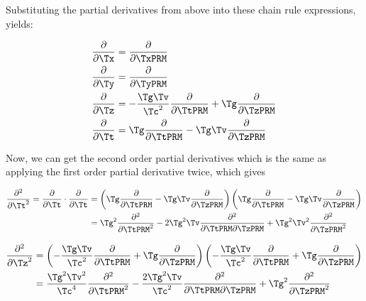 \begin{derivation}
	Substituting the partial derivatives from above into these chain rule expressions, yields:

	\begin{equation}
		\begin{aligned}
			\frac{\partial}{\partial \Tx } & = \frac{\partial}{\partial \TxPRM }                                                             \\
			\frac{\partial}{\partial \Ty } & = \frac{\partial}{\partial \TyPRM }                                                             \\
			\frac{\partial}{\partial \Tz } & = -\frac{\Tg  \Tv }{\Tc ^2} \frac{\partial}{\partial \TtPRM } + \Tg  \frac{\partial}{\partial \TzPRM } \\
			\frac{\partial}{\partial \Tt } & = \Tg  \frac{\partial}{\partial \TtPRM } - \Tg  \Tv  \frac{\partial}{\partial \TzPRM }
		\end{aligned}
	\end{equation}

	Now, we can get the second order partial derivatives which is the same as applying the first order partial derivative twice, which gives

	\begin{equation}
		\begin{aligned}
			\frac{\partial^2}{\partial \Tt ^2} = \frac{\partial}{\partial \Tt } \cdot \frac{\partial}{\partial \Tt } & = \left(\Tg  \frac{\partial}{\partial \TtPRM } - \Tg  \Tv  \frac{\partial}{\partial \TzPRM }\right) \left(\Tg  \frac{\partial}{\partial \TtPRM } - \Tg  \Tv  \frac{\partial}{\partial \TzPRM }\right) \\
			                                                                                                & = \Tg ^2 \frac{\partial^2}{\partial \TtPRM ^2} - 2\Tg ^2 \Tv  \frac{\partial^2}{\partial \TtPRM \partial \TzPRM } + \Tg ^2 \Tv ^2 \frac{\partial^2}{\partial \TzPRM ^2}
		\end{aligned}
	\end{equation}

	\begin{equation}
		\begin{aligned}
			\frac{\partial^2}{\partial \Tz ^2} & = \left(-\frac{\Tg  \Tv }{\Tc ^2} \frac{\partial}{\partial \TtPRM } + \Tg  \frac{\partial}{\partial \TzPRM }\right) \left(-\frac{\Tg  \Tv }{\Tc ^2} \frac{\partial}{\partial \TtPRM } + \Tg  \frac{\partial}{\partial \TzPRM }\right) \\
			                                & = \frac{\Tg ^2 \Tv ^2}{\Tc ^4} \frac{\partial^2}{\partial \TtPRM ^2} - \frac{2\Tg ^2 \Tv }{\Tc ^2} \frac{\partial^2}{\partial \TtPRM \partial \TzPRM } + \Tg ^2 \frac{\partial^2}{\partial \TzPRM ^2}
		\end{aligned}
	\end{equation}


\end{derivation}
